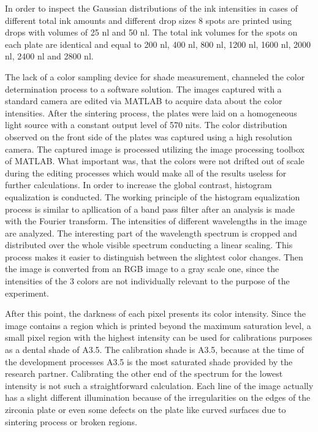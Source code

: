 In order to inspect the Gaussian distributions of the ink intensities in cases of different total ink amounts and different drop sizes 8 spots are printed using drops with volumes of 25 nl and 50 nl. The total ink volumes for the spots on each plate are identical and equal to 200 nl, 400 nl, 800 nl, 1200 nl, 1600 nl, 2000 nl, 2400 nl and 2800 nl.

The lack of a color sampling device for shade measurement, channeled the color determination process to a software solution. The images captured with a standard camera are edited via MATLAB to acquire data about the color intensities. After the sintering process, the plates were laid on a homogeneous light source with a constant output level of 570 nits. The color distribution observed on the front side of the plates was captured using a high resolution camera. The captured image is processed utilizing the image processing toolbox of MATLAB. What important was, that the colors were not drifted out of scale during the editing processes which would make all of the results useless for further calculations. In order to increase the global contrast, histogram equalization is conducted. The working principle of the histogram equalization process is similar to apllication of a band pass filter after an analysis is made with the Fourier transform. The intensities of different wavelengths in the image are analyzed. The interesting part of the wavelength spectrum is cropped and distributed over the whole visible spectrum conducting a linear scaling. This process makes it easier to distinguish between the slightest color changes. Then the image is converted from an RGB image to a gray scale one, since the intensities of the 3 colors are not individually relevant to the purpose of the experiment. 

After this point, the darkness of each pixel presents its color intensity. Since the image contains a region which is printed beyond the maximum saturation level, a small pixel region with the highest intensity can be used for calibrations purposes as a dental shade of A3.5. The calibration shade is A3.5, because at the time of the development processes A3.5 is the most saturated shade provided by the research partner. Calibrating the other end of the spectrum for the lowest intensity is not such a straightforward calculation. Each line of the image actually has a slight different illumination because of the irregularities on the edges of the zirconia plate or even some defects on the  plate like curved surfaces due to sintering process or broken regions.

